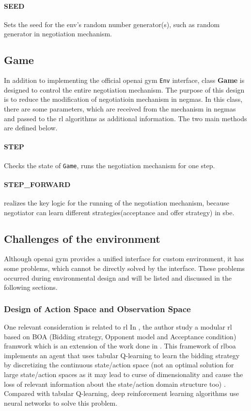 \paragraph{SEED} Sets the seed for the env's random number generator(s), such as random generator in negotiation mechanism.

\subsection{Game} \label{game}
In addition to implementing the official \gls{openai gym} \texttt{Env} interface, class \textbf{Game} is designed to control the entire negotiation mechanism. The purpose of this design is to reduce the modification of negotiatioin mechanism in \gls{negmas}. In this class, there are some parameters, which are received from the mechanism in \gls{negmas} and passed to the \gls{rl} algorithms as additional information. The two main methods are defined below.
 
\paragraph{STEP} Checks the state of \texttt{Game}, runs the negotiation mechanism for one step.
\paragraph{STEP\_FORWARD} realizes the key logic for the running of the negotiation mechanism, because negotiator can learn different strategies(acceptance and offer strategy) in \gls{sbe}. 

\subsection{Challenges of the environment}
Although \gls{openai gym} provides a unified interface for custom environment, it has some problems, which cannot be directly solved by the interface. These problems occurred during environmental design and will be listed and discussed in the following sections. 

\subsubsection{Design of Action Space and Observation Space}
One relevant consideration is related to \gls{rl} In \parencite{Bakker2019RLBOAAM}, the author study a modular \gls{rl} based on BOA (Bidding strategy, Opponent model and Acceptance condition) framwork which is an extension of the work done in \parencite{Bakker2019RLBOAAM}. This framework of \gls{rlboa} implements an agent that uses tabular Q-learning to learn the bidding strategy by discretizing the continuous state/action space (not an optimal solution for large state/action spaces as it may lead to curse of dimensionality and cause the loss of relevant information about the state/action domain structure too) \parencite{bagga2020deep}. 
Compared with tabular Q-learning, deep reinforcement learning algorithms use neural networks to solve this problem.
 
